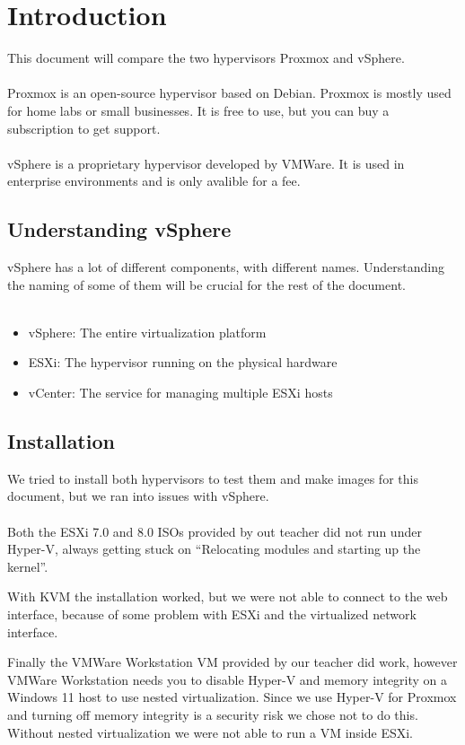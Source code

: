 \section{Introduction}
This document will compare the two hypervisors Proxmox and vSphere.
\\\\
Proxmox is an open-source hypervisor based on Debian. Proxmox is mostly used for home labs or small businesses. It is free to use, but you can buy a subscription to get support.
\\\\
vSphere is a proprietary hypervisor developed by VMWare. It is used in enterprise environments and is only avalible for a fee.

\subsection{Understanding vSphere}

vSphere has a lot of different components, with different names. Understanding the naming of some of them will be crucial for the rest of the document.
\\\\
\begin{itemize}
	\item vSphere: The entire virtualization platform
	\item ESXi: The hypervisor running on the physical hardware
	\item vCenter: The service for managing multiple ESXi hosts
\end{itemize}

\subsection{Installation}

We tried to install both hypervisors to test them and make images for this document, but we ran into issues with vSphere.
\\\\
Both the ESXi 7.0 and 8.0 ISOs provided by out teacher did not run under Hyper-V, always getting stuck on ``Relocating modules and starting up the kernel''.

With KVM the installation worked, but we were not able to connect to the web interface, because of some problem with ESXi and the virtualized network interface.

Finally the VMWare Workstation VM provided by our teacher did work, however VMWare Workstation needs you to disable Hyper-V and memory integrity on a Windows 11 host to use nested virtualization. Since we use Hyper-V for Proxmox and turning off memory integrity is a security risk we chose not to do this. Without nested virtualization we were not able to run a VM inside ESXi.